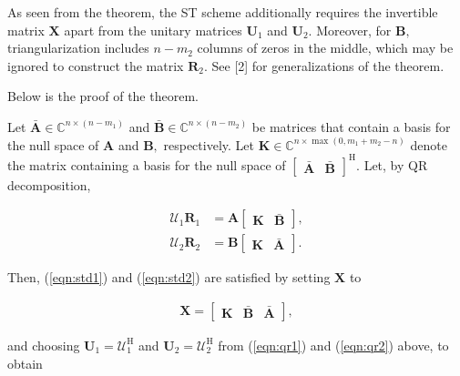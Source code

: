 As seen from the theorem, the ST scheme additionally requires the invertible matrix $\boldsymbol{X}$ apart from the unitary matrices $\boldsymbol{U}_1$ and $\boldsymbol{U}_2.$ Moreover, for $\boldsymbol{B},$ triangularization includes $n-m_2$ columns of zeros in the middle, which may be ignored to construct the matrix $\boldsymbol{R}_2.$ See [2] for generalizations of the theorem.

Below is the proof of the theorem.

Let  $\bar{\boldsymbol{A}} \in \mathbb{C}^{n\times (n-m_1)}$ and $\bar{\boldsymbol{B}} \in \mathbb{C}^{n\times (n-m_2)}$ be matrices that contain a basis for the null space of $\boldsymbol{A}$ and $\boldsymbol{B},$ respectively. Let $\boldsymbol{K} \in \mathbb{C}^{n\times \max(0,m_1+m_2-n)}$ denote the matrix containing a basis for the null space of $\begin{bmatrix} \bar{\boldsymbol{A}} & \bar{\boldsymbol{B}}\end{bmatrix}^\mathrm{H}.$ Let, by QR decomposition,

\begin{align}\boldsymbol{\mathcal{U}}_1 \boldsymbol{R}_1 &= \boldsymbol{A} \begin{bmatrix}\boldsymbol{K} & \bar{\boldsymbol{B}}\end{bmatrix}, \label{eqn:qr1}\\ \boldsymbol{\mathcal{U}}_2 \boldsymbol{R}_2 &= \boldsymbol{B} \begin{bmatrix}\boldsymbol{K} & \bar{\boldsymbol{A}}\end{bmatrix}.\label{eqn:qr2}\end{align}

Then, (\ref{eqn:std1}) and (\ref{eqn:std2}) are satisfied by setting $\boldsymbol{X}$ to

\begin{align}\boldsymbol{X} = \begin{bmatrix}\boldsymbol{K} & \bar{\boldsymbol{B}} & \bar{\boldsymbol{A}}\end{bmatrix}, \label{eqn:x}\end{align}

and choosing $\boldsymbol{U}_1 = \boldsymbol{\mathcal{U}}_1^\mathrm{H}$ and $\boldsymbol{U}_2 = \boldsymbol{\mathcal{U}}_2^\mathrm{H}$ from (\ref{eqn:qr1}) and (\ref{eqn:qr2}) above, to obtain

